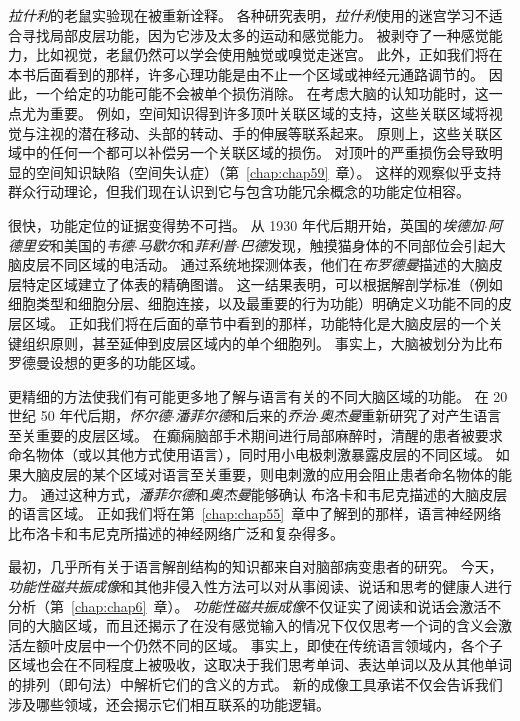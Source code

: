 \textit{拉什利}的老鼠实验现在被重新诠释。
各种研究表明，\textit{拉什利}使用的迷宫学习不适合寻找局部皮层功能，因为它涉及太多的运动和感觉能力。
被剥夺了一种感觉能力，比如视觉，老鼠仍然可以学会使用触觉或嗅觉走迷宫。
此外，正如我们将在本书后面看到的那样，许多心理功能是由不止一个区域或神经元通路调节的。
因此，一个给定的功能可能不会被单个损伤消除。
在考虑大脑的认知功能时，这一点尤为重要。
例如，空间知识得到许多顶叶关联区域的支持，这些关联区域将视觉与注视的潜在移动、头部的转动、手的伸展等联系起来。
原则上，这些关联区域中的任何一个都可以补偿另一个关联区域的损伤。
对顶叶的严重损伤会导致明显的空间知识缺陷（空间失认症）（第~\ref{chap:chap59}~章）。
这样的观察似乎支持群众行动理论，但我们现在认识到它与包含功能冗余概念的功能定位相容。


很快，功能定位的证据变得势不可挡。
从 1930 年代后期开始，英国的\textit{埃德加$\cdot$阿德里安}和美国的\textit{韦德$\cdot$马歇尔}和\textit{菲利普$\cdot$巴德}发现，触摸猫身体的不同部位会引起大脑皮层不同区域的电活动。
通过系统地探测体表，他们在\textit{布罗德曼}描述的大脑皮层特定区域建立了体表的精确图谱。
这一结果表明，可以根据解剖学标准（例如细胞类型和细胞分层、细胞连接，以及最重要的行为功能）明确定义功能不同的皮层区域。
正如我们将在后面的章节中看到的那样，功能特化是大脑皮层的一个关键组织原则，甚至延伸到皮层区域内的单个细胞列。
事实上，大脑被划分为比布罗德曼设想的更多的功能区域。


更精细的方法使我们有可能更多地了解与语言有关的不同大脑区域的功能。
在 20 世纪 50 年代后期，\textit{怀尔德$\cdot$潘菲尔德}和后来的\textit{乔治$\cdot$奥杰曼}重新研究了对产生语言至关重要的皮层区域。
在癫痫脑部手术期间进行局部麻醉时，清醒的患者被要求命名物体（或以其他方式使用语言），同时用小电极刺激暴露皮层的不同区域。
如果大脑皮层的某个区域对语言至关重要，则电刺激的应用会阻止患者命名物体的能力。
通过这种方式，\textit{潘菲尔德}和\textit{奥杰曼}能够确认 布洛卡和韦尼克描述的大脑皮层的语言区域。
正如我们将在第~\ref{chap:chap55}~章中了解到的那样，语言神经网络比布洛卡和韦尼克所描述的神经网络广泛和复杂得多。


最初，几乎所有关于语言解剖结构的知识都来自对脑部病变患者的研究。
今天，\textit{功能性磁共振成像}和其他非侵入性方法可以对从事阅读、说话和思考的健康人进行分析（第~\ref{chap:chap6}~章）。
\textit{功能性磁共振成像}不仅证实了阅读和说话会激活不同的大脑区域，而且还揭示了在没有感觉输入的情况下仅仅思考一个词的含义会激活左额叶皮层中一个仍然不同的区域。
事实上，即使在传统语言领域内，各个子区域也会在不同程度上被吸收，这取决于我们思考单词、表达单词以及从其他单词的排列（即句法）中解析它们的含义的方式。
新的成像工具承诺不仅会告诉我们涉及哪些领域，还会揭示它们相互联系的功能逻辑。


